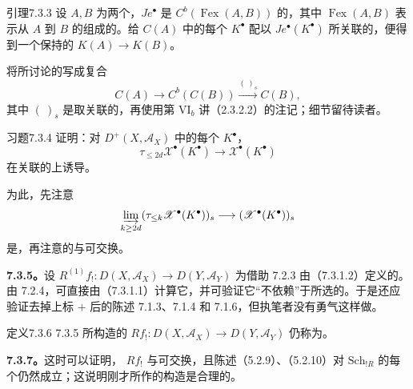 \begin{SGAresult}{引理}{7.3.3}
设 $A,B$ 为两个，$Je^\bullet$ 是 $C^b(\operatorname{Fex}(A,B))$ 的，其中 $\operatorname{Fex}(A,B)$ 表示从 $A$ 到 $B$ 的组成的。给 $C(A)$ 中的每个 $K^\bullet$ 配以 $Je^\bullet(K^\bullet)$ 所关联的，便得到一个保持的 $K(A)\to K(B)$。
\end{SGAresult}
将所讨论的写成复合
\[C(A)\longrightarrow C^b(C(B))\xrightarrow{(\ )_s}C(B),\]
其中 $(\ )_s$ 是取关联的，再使用第 VI$_b$ 讲（2.3.2.2）的注记；细节留待读者。

\begin{SGAresult}{习题}{7.3.4}
证明：对 $D^+(X,\mathscr A_X)$ 中的每个 $K^\bullet$，
\[\tau_{\le2d}\mathscr X^\bullet(K^\bullet)\longrightarrow\mathscr X^\bullet(K^\bullet)\]
在关联的上诱导。
\end{SGAresult}
为此，先注意
\[\varinjlim_{k\ge2d}(\tau_{\le k}\mathscr X^\bullet(K^\bullet))_s
\longrightarrow(\mathscr X^\bullet(K^\bullet))_s\]
是，再注意的与可交换。

\textbf{7.3.5。}设 $R^{(1)}f_!:D(X,\mathscr A_X)\to D(Y,\mathscr A_Y)$ 为借助 7.2.3 由（7.3.1.2）定义的。由 7.2.4，可直接由（7.3.1.1）计算它，并可验证它“不依赖”于所选的。于是还应验证去掉上标 $+$ 后的陈述 7.1.3、7.1.4 和 7.1.6，但执笔者没有勇气这样做。

\begin{SGAresult}{定义}{7.3.6}
7.3.5 所构造的 $Rf_!:D(X,\mathscr A_X)\to D(Y,\mathscr A_Y)$ 仍称为。
\end{SGAresult}

\textbf{7.3.7。}这时可以证明， $Rf_!$ 与可交换，且陈述（5.2.9）、（5.2.10）对 $\mathrm{Sch}_{!R}$ 的每个仍然成立；这说明刚才所作的构造是合理的。

